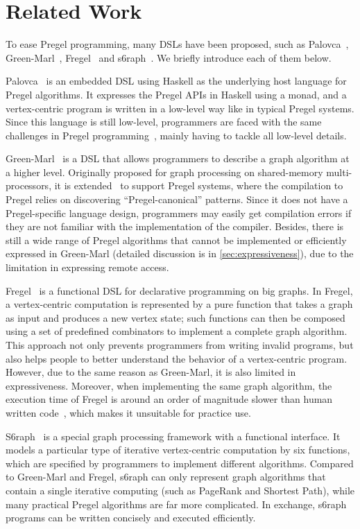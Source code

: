\documentclass{sokendai_thesis} %
\begin{document}
\section{Related Work}

To ease Pregel programming, many DSLs have been proposed, such as Palovca~\cite{palovca}, Green-Marl~\cite{green14}, Fregel~\cite{fregel} and s6raph~\cite{s6raph}.
We briefly introduce each of them below.

Palovca~\cite{palovca} is an embedded DSL using Haskell as the underlying host language for Pregel algorithms.
It expresses the Pregel APIs in Haskell using a monad, and a vertex-centric program is written in a low-level way like in typical Pregel systems.
Since this language is still low-level, programmers are faced with the same challenges in Pregel programming~\cite{green14, fregel}, mainly having to tackle all low-level details.

Green-Marl~\cite{green12} is a DSL that allows programmers to describe a graph algorithm at a higher level.
Originally proposed for graph processing on shared-memory multi-processors, it is extended~\cite{green14} to support Pregel systems, where the compilation to Pregel relies on discovering ``Pregel-canonical'' patterns.
Since it does not have a Pregel-specific language design, programmers may easily get compilation errors if they are not familiar with the implementation of the compiler.
Besides, there is still a wide range of Pregel algorithms that cannot be implemented or efficiently expressed in Green-Marl (detailed discussion is in \autoref{sec:expressiveness}), due to the limitation in expressing remote access.

Fregel~\cite{fregel} is a functional DSL for declarative programming on big graphs.
In Fregel, a vertex-centric computation is represented by a pure function that takes a graph as input and produces a new vertex state; such functions can then be composed using a set of predefined combinators to implement a complete graph algorithm.
This approach not only prevents programmers from writing invalid programs, but also helps people to better understand the behavior of a vertex-centric program.
However, due to the same reason as Green-Marl, it is also limited in expressiveness.
Moreover, when implementing the same graph algorithm, the execution time of Fregel is around an order of magnitude slower than human written code~\cite{fregel}, which makes it unsuitable for practice use.

S6raph~\cite{s6raph} is a special graph processing framework with a functional interface. It models a particular type of iterative vertex-centric computation by six functions, which are specified by programmers to implement different algorithms.
Compared to Green-Marl and Fregel, s6raph can only represent graph algorithms that contain a single iterative computing (such as PageRank and Shortest Path), while many practical Pregel algorithms are far more complicated.
In exchange, s6raph programs can be written concisely and executed efficiently.
\end{document}
